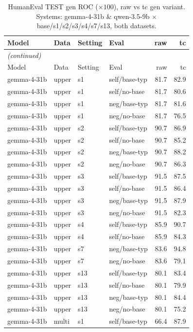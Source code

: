 {\small
\begin{longtable}{llll rr}
\caption{HumanEval TEST gen ROC ($\times100$), raw vs tc gen variant. Systems: gemma-4-31b \& qwen-3.5-9b $\times$ base/s1/s2/s3/s4/s7/s13, both datasets.}\label{tab:he_test_gen_roc}\\
\toprule
Model & Data & Setting & Eval & raw & tc \\
\midrule
\endfirsthead
\multicolumn{6}{l}{\itshape (continued)}\\
\toprule
Model & Data & Setting & Eval & raw & tc \\
\midrule
\endhead
\bottomrule
\endfoot
gemma-4-31b & upper & s1 & self/base-typ & 81.7 & 82.9 \\
gemma-4-31b & upper & s1 & self/no-base & 81.7 & 80.6 \\
gemma-4-31b & upper & s1 & neg/base-typ & 81.7 & 81.6 \\
gemma-4-31b & upper & s1 & neg/no-base & 81.7 & 76.5 \\
gemma-4-31b & upper & s2 & self/base-typ & 90.7 & 86.9 \\
gemma-4-31b & upper & s2 & self/no-base & 90.7 & 85.2 \\
gemma-4-31b & upper & s2 & neg/base-typ & 90.7 & 88.2 \\
gemma-4-31b & upper & s2 & neg/no-base & 90.7 & 86.3 \\
gemma-4-31b & upper & s3 & self/base-typ & 91.5 & 87.5 \\
gemma-4-31b & upper & s3 & self/no-base & 91.5 & 86.4 \\
gemma-4-31b & upper & s3 & neg/base-typ & 91.5 & 87.9 \\
gemma-4-31b & upper & s3 & neg/no-base & 91.5 & 82.3 \\
gemma-4-31b & upper & s4 & self/base-typ & 85.9 & 90.7 \\
gemma-4-31b & upper & s4 & self/no-base & 85.9 & 84.3 \\
gemma-4-31b & upper & s7 & neg/base-typ & 83.6 & 94.8 \\
gemma-4-31b & upper & s7 & neg/no-base & 83.6 & 79.1 \\
gemma-4-31b & upper & s13 & self/base-typ & 80.1 & 83.4 \\
gemma-4-31b & upper & s13 & self/no-base & 80.1 & 79.9 \\
gemma-4-31b & upper & s13 & neg/base-typ & 80.1 & 84.4 \\
gemma-4-31b & upper & s13 & neg/no-base & 80.1 & 75.2 \\
\midrule
gemma-4-31b & multi & s1 & self/base-typ & 66.4 & 87.9 \\

\end{longtable}}
